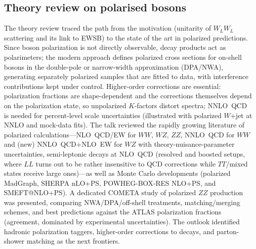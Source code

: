 \subsection{Theory review on polarised bosons}
The theory review traced the path from the motivation (unitarity of
$W_LW_L$ scattering and its link to EWSB) to the state of the art in polarized
predictions. Since boson polarization is not directly observable, decay
products act as polarimeters; the modern approach defines polarized cross
sections for on-shell bosons in the double-pole or narrow-width approximation
(DPA/NWA), generating separately polarized samples that are fitted to data,
with interference contributions kept under control. Higher-order corrections
are essential: polarization fractions are shape-dependent and the corrections
themselves depend on the polarization state, so unpolarized $K$-factors
distort spectra; NNLO~QCD is needed for percent-level scale uncertainties
(illustrated with polarized $W$+jet at NNLO and mock-data fits). The talk
reviewed the rapidly growing literature of polarized calculations---NLO~QCD/EW
for $WW$, $WZ$, $ZZ$, NNLO~QCD for $WW$ and (new) NNLO~QCD+NLO~EW for $WZ$ with
theory-nuisance-parameter uncertainties, semi-leptonic decays at NLO~QCD
(resolved and boosted setups, where $LL$ turns out to be rather insensitive to
QCD corrections while $TT$/mixed states receive large ones)---as well as
Monte Carlo developments (polarized MadGraph, SHERPA nLO+PS, POWHEG-BOX-RES
NLO+PS, and SMEFT@NLO+PS). A dedicated COMETA study of polarized $ZZ$
production was presented, comparing NWA/DPA/off-shell treatments,
matching/merging schemes, and best predictions against the ATLAS polarization
fractions (agreement, dominated by experimental uncertainties). The outlook
identified hadronic polarization taggers, higher-order corrections to decays,
and parton-shower matching as the next frontiers.

